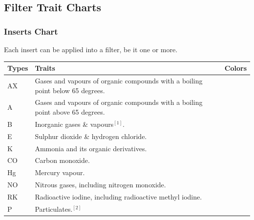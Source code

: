 \documentclass[a4paper, 12pt, oneside]{article}
\begin{document}
{	\subsection{Filter Trait Charts}
	\subsubsection{Inserts Chart}
		Each insert can be applied into a filter, be it one or more.
		\begin{tabular}{|p{1cm}||p{10cm}|p{1.57cm}|}
			\hline
			Types & Traits & Colors \\\hline
			AX & Gases and vapours of organic compounds with a boiling point below 65 degrees. & \cellcolor[HTML]{995000} \\
			A & Gases and vapours of organic compounds with a boiling point above 65 degrees. & \cellcolor[HTML]{997000} \\
			B & Inorganic gases \& vapours$^{[1]}$. & \cellcolor[HTML]{CACACA} \\
			E & Sulphur dioxide \& hydrogen chloride. & \cellcolor[HTML]{CCBB00} \\
			K & Ammonia and its organic derivatives. & \cellcolor[HTML]{00AA00} \\
			CO & Carbon monoxide. & \cellcolor[HTML]{000000} \\
			Hg & Mercury vapour. & \cellcolor[HTML]{990000} \\
			NO & Nitrous gases, including nitrogen monoxide. & \cellcolor[HTML]{0000BB} \\
			RK & Radioactive iodine, including radioactive methyl iodine. & \cellcolor[HTML]{E96000} \\
			P & Particulates.$^{[2]}$ & \cellcolor[HTML]{424242} \\\hline
		\end{tabular} \-\\
}
\end{document}
